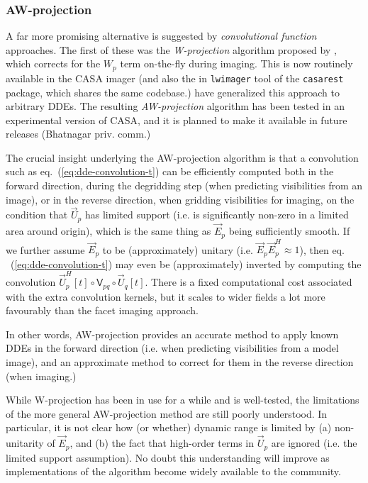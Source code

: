 \documentclass[]{aa}
\newcommand{\herm}{H}
\newcommand{\jones}[2]{\vec {#1}_{#2}}
\newcommand{\jonesT}[2]{\vec {#1}^{\herm}_{#2}}
\newcommand{\coh}[2]{\mathsf{{#1}}_{{#2}}}
\begin{document}
\subsubsection{AW-projection}

A far more promising alternative is suggested by \emph{convolutional function} approaches. The first of these was the \emph{W-projection} algorithm proposed by \citet{Cornwell:wproj}, which corrects for the $W_p$ term on-the-fly during imaging. This is now routinely available in the CASA imager (and also the in {\tt lwimager} tool of the {\tt casarest} package, which shares the same codebase.) \citet{SB:imageplane} have generalized this approach to arbitrary DDEs. The resulting \emph{AW-projection} algorithm has been tested in an experimental version of CASA, and it is planned to make it available in future releases (Bhatnagar priv. comm.)

The crucial insight underlying the AW-projection algorithm is that a convolution such as eq.~(\ref{eq:dde-convolution-t}) can be efficiently computed both in the forward direction, during the degridding step (when predicting visibilities from an image), or in the reverse direction, when gridding visibilities for imaging, on the condition that $\jones{U}{p}$ has limited support (i.e. is significantly non-zero in a limited area around origin), which is the same thing as $\jones{E}{p}$ being sufficiently smooth. If we further assume $\jones{E}{p}$ to be (approximately) unitary (i.e. 
$\jones{E}{p}\jonesT{E}{p}\approx1$), then eq. ~(\ref{eq:dde-convolution-t}) may even be (approximately) inverted by computing the convolution $\jonesT{U}{p}[t] \circ \coh{V}{pq} \circ \jones{U}{q}[t]$. There is a fixed computational cost associated with the extra convolution kernels, but it scales to wider fields a lot more favourably than the facet imaging approach.

In other words, AW-projection provides an accurate method to apply known DDEs in the forward direction (i.e. when predicting visibilities from a model image), and an approximate method to correct for them in the reverse direction (when imaging.)

While W-projection has been in use for a while and is well-tested, the limitations of the more general AW-projection method are still poorly understood. In particular, it is not clear how (or whether) dynamic range is limited by (a) non-unitarity of $\jones{E}{p}$, and (b) the fact that high-order terms in $\jones{U}{p}$ are ignored (i.e. the limited support assumption). No doubt this understanding will improve as implementations of the algorithm become widely available to the community.
\end{document}
